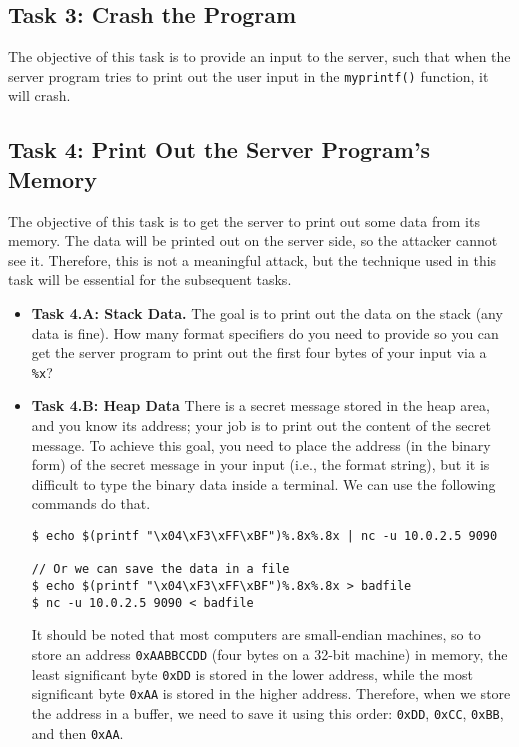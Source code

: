  

\subsection{Task 3: Crash the Program}

The objective of this task is to provide an input to the server, such that
when the server program tries to print out the user input in the 
\texttt{myprintf()} function, it will crash.  


\subsection{Task 4: Print Out the Server Program's Memory}

The objective of this task is to get the server to print out some data 
from its memory. The data will be printed out on the server side, so
the attacker cannot see it. Therefore, this is not a meaningful
attack, but the technique used in this task will be essential for 
the subsequent tasks. 


\begin{itemize} 
\item \textbf{Task 4.A: Stack Data.}
The goal is to print out the data on the stack (any data is fine). 
How many format specifiers do you need to provide so you can get 
the server program to print out the first four bytes of your 
input via a \texttt{\%x}? 


\item \textbf{Task 4.B: Heap Data} 
There is a secret message stored in the heap area, and you know 
its address; your job is to print out the content of the secret message. 
To achieve this goal, you need to place the address (in the binary form) 
of the secret message in your input (i.e., the format string), but
it is difficult to type the binary data inside a terminal. We can use the following commands 
do that. 

\begin{lstlisting}
$ echo $(printf "\x04\xF3\xFF\xBF")%.8x%.8x | nc -u 10.0.2.5 9090

// Or we can save the data in a file
$ echo $(printf "\x04\xF3\xFF\xBF")%.8x%.8x > badfile
$ nc -u 10.0.2.5 9090 < badfile
\end{lstlisting}

It should be noted that most computers are small-endian machines, so to store
an address \texttt{0xAABBCCDD} (four bytes on a 32-bit machine) in memory, 
the least significant byte \texttt{0xDD} is stored in the lower address,
while the most significant byte \texttt{0xAA} is stored in the higher 
address. Therefore, when we store the address in a buffer, we need to 
save it using this order: \texttt{0xDD}, \texttt{0xCC}, \texttt{0xBB}, and 
then \texttt{0xAA}. 
\end{itemize} 


